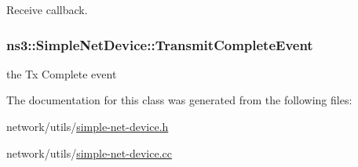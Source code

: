 Receive callback. 

\subsubsection[{\texorpdfstring{Transmit\+Complete\+Event}{TransmitCompleteEvent}}]{ ns3\+::\+Simple\+Net\+Device\+::\+Transmit\+Complete\+Event\hspace{0.3cm}{\ttfamily [private]}}\hypertarget{classns3_1_1SimpleNetDevice_ad6fa5b2d21a557883c8c6d615ee6f066}{}\label{classns3_1_1SimpleNetDevice_ad6fa5b2d21a557883c8c6d615ee6f066}


the Tx Complete event 



The documentation for this class was generated from the following files\+:\begin{DoxyCompactItemize}
\item 
network/utils/\hyperlink{simple-net-device_8h}{simple-\/net-\/device.\+h}\item 
network/utils/\hyperlink{simple-net-device_8cc}{simple-\/net-\/device.\+cc}\end{DoxyCompactItemize}
